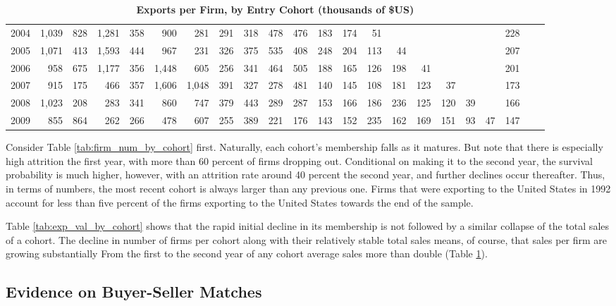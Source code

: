 \begin{table}
{\begin{tabular}{l|rrrrrrrrrrrrrrrrrrrr|r}
2004 & 1,039 & 828  & 1,281 & 358  & 900   & 281   & 291  & 318  & 478  & 476  & 183  & 174  & 51   &      &      &      &      &      & 228 \\
2005 & 1,071 & 413  & 1,593 & 444  & 967   & 231   & 326  & 375  & 535  & 408  & 248  & 204  & 113  & 44   &      &      &      &      & 207 \\
2006 & 958   & 675  & 1,177 & 356  & 1,448 & 605   & 256  & 341  & 464  & 505  & 188  & 165  & 126  & 198  & 41   &      &      &      & 201 \\
2007 & 915   & 175  & 466   & 357  & 1,606 & 1,048 & 391  & 327  & 278  & 481  & 140  & 145  & 108  & 181  & 123  & 37   &      &      & 173 \\
2008 & 1,023 & 208  & 283   & 341  & 860   & 747   & 379  & 443  & 289  & 287  & 153  & 166  & 186  & 236  & 125  & 120  & 39   &      & 166 \\
2009 & 855   & 864  & 262   & 266  & 478   & 607   & 255  & 389  & 221  & 176  & 143  & 152  & 235  & 162  & 169  & 151  & 93   & 47   & 147 \\ \hline
    \end{tabular}
    }
    \caption{\textbf{Exports per Firm, by Entry Cohort (thousands of \$US)}}
    \label{tab:exp_per_firm_by_cohort}\centering
\end{table}

Consider Table \ref{tab:firm_num_by_cohort} first. Naturally, each cohort's
membership falls as it matures. But note that there is especially high
attrition the first year, with more than 60 percent of firms dropping out.
Conditional on making it to the second year, the survival probability is
much higher, however, with an attrition rate around 40 percent the second
year, and further declines occur thereafter. Thus, in terms of
numbers, the most recent cohort is always larger than any previous one.
Firms that were exporting to the United States in 1992 account for less than
five percent of the firms exporting to the United States towards the end of
the sample.

Table \ref{tab:exp_val_by_cohort} shows that the rapid initial decline in
its membership is not followed by a similar collapse of the total sales of a
cohort. The decline in number of firms per cohort along with their
relatively stable total sales means, of course, that sales per firm are
growing substantially From the first to the second year of any cohort
average sales more than double (Table \ref{tab:exp_per_firm_by_cohort}).

\subsection{Evidence on Buyer-Seller Matches}

